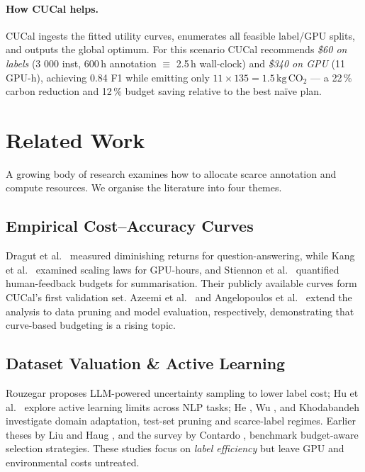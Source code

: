 \documentclass[11pt]{article}
\newcommand{\COtwo}{\mathrm{CO_{2}}}  %
\begin{document}
\paragraph{How CUCal helps.}
CUCal ingests the fitted utility curves, enumerates all feasible
label/GPU splits, and outputs the global optimum.
For this scenario CUCal recommends
\emph{\$60 on labels} (3 000 inst, 600\,h annotation $\equiv$ 2.5\,h 
wall-clock) and
\emph{\$340 on GPU} (11 GPU-h),
achieving 0.84 F1 while emitting only
$11\times135 = 1.5\,\text{kg}\,\COtwo$ —
a 22\,\% carbon reduction and 12\,\% budget saving
relative to the best naïve plan.

\section{Related Work}

A growing body of research examines how to allocate scarce annotation and
compute resources.  We organise the literature into four themes.

\subsection{Empirical Cost--Accuracy Curves}
Dragut et al.~\citeyearpar{Dragut2019} measured diminishing returns for
question-answering, while Kang et al.~\citeyearpar{Kang2023} examined scaling
laws for GPU-hours, and Stiennon et al.~\citeyearpar{Stiennon2021}
quantified human-feedback budgets for summarisation.  
Their publicly available curves form CUCal’s first validation set.  
Azeemi et al.~\citeyearpar{Azeemi2024} and
Angelopoulos et al.~\citeyearpar{Angelopoulos2025} extend the analysis to
data pruning and model evaluation, respectively, demonstrating that
curve-based budgeting is a rising topic.

\subsection{Dataset Valuation \& Active Learning}
Rouzegar \citeyearpar{Rouzegar2024} proposes LLM-powered uncertainty
sampling to lower label cost; Hu et al.~\citeyearpar{Hu2021} explore active
learning limits across NLP tasks; He \citeyearpar{He2024},
Wu \citeyearpar{Wu2024}, and Khodabandeh \citeyearpar{Khodabandeh2023}
investigate domain adaptation, test-set pruning and scarce-label regimes.
Earlier theses by Liu \citeyearpar{Liu2019} and
Haug \citeyearpar{Haug2021}, and the survey by
Contardo \citeyearpar{Contardo2017}, benchmark budget-aware selection
strategies.
These studies focus on \emph{label efficiency} but leave GPU and
environmental costs untreated.
\end{document}
